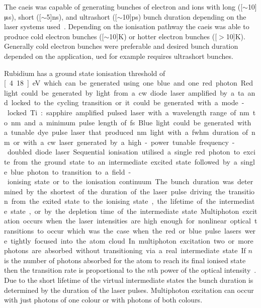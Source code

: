 The \gls{caeis} was capable of generating bunches of electron and ions with long (\unit[$\sim$10]{$\muup$s}), short (\unit[$\sim$5]{ns}), and ultrashort (\unit[$\sim$10]{ps}) bunch duration depending on the laser systems used~\cite{speirs_identification_2017,speirs_electron_2017}.
Depending on the ionisation pathway the \gls{caeis} was able to produce cold electron bunches (\unit[$\sim$10]{K}) or hotter electron bunches (\unit[$>$10]{K}).
Generally cold electron bunches were preferable and desired bunch duration depended on the application, \gls{ued} for example requires ultrashort bunches.

Rubidium has a ground state ionisation threshold of \unit[4.18]{eV} which can be generated using one blue and one red photon.
Red light could be generated by light from a \gls{cw} diode laser amplified by a \gls{ta} and locked to the cycling transition or it could be generated with a mode-locked Ti:sapphire amplified pulsed laser with a wavelength range of \unit[770]{nm} to \unit[830]{nm} and a minimum pulse length of \unit[35]{fs}.
Blue light could be generated with a tunable dye pulse laser that produced \unit[460 to 490]{nm} light with a \gls{fwhm} duration of \unit[5]{nm} or with a \gls{cw} laser generated by a high-power tunable frequency-doubled diode laser.

Sequential ionisation utilised a single red photon to excite from the ground state to an intermediate excited state followed by a single blue photon to transition to a field-ionising state or to the ionisation continuum.
The bunch duration was determined by the shortest of the duration of the laser pulse driving the transition from the exited state to the ionising state, the lifetime of the intermediate state, or by the depletion time of the intermediate state.

Multiphoton excitation occurs when the laser intensities are high enough for nonlinear optical transitions to occur which was the case when the red or blue pulse lasers were tightly focused into the atom cloud.
In multiphoton excitation two or more photons are absorbed without transitioning via a real intermediate state.
If $n$ is the number of photons absorbed for the atom to reach its final ionised state then the transition rate is proportional to the $n$th power of the optical intensity~\cite{joachain_atoms_2011}.
Due to the short lifetime of the virtual intermediate states the bunch duration is determined by the duration of the laser pulses.
Multiphoton excitation can occur with just photons of one colour or with photons of both colours.

